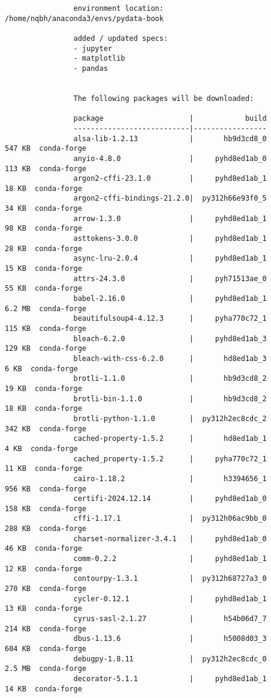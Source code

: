 \documentclass{article}
\begin{document}
\begin{itemize}
\begin{itemize}
\begin{itemize}
\begin{verbatim}
				environment location: /home/nqbh/anaconda3/envs/pydata-book
				
				added / updated specs:
				- jupyter
				- matplotlib
				- pandas
				
				
				The following packages will be downloaded:
				
				package                    |            build
				---------------------------|-----------------
				alsa-lib-1.2.13            |       hb9d3cd8_0         547 KB  conda-forge
				anyio-4.8.0                |     pyhd8ed1ab_0         113 KB  conda-forge
				argon2-cffi-23.1.0         |     pyhd8ed1ab_1          18 KB  conda-forge
				argon2-cffi-bindings-21.2.0|  py312h66e93f0_5          34 KB  conda-forge
				arrow-1.3.0                |     pyhd8ed1ab_1          98 KB  conda-forge
				asttokens-3.0.0            |     pyhd8ed1ab_1          28 KB  conda-forge
				async-lru-2.0.4            |     pyhd8ed1ab_1          15 KB  conda-forge
				attrs-24.3.0               |     pyh71513ae_0          55 KB  conda-forge
				babel-2.16.0               |     pyhd8ed1ab_1         6.2 MB  conda-forge
				beautifulsoup4-4.12.3      |     pyha770c72_1         115 KB  conda-forge
				bleach-6.2.0               |     pyhd8ed1ab_3         129 KB  conda-forge
				bleach-with-css-6.2.0      |       hd8ed1ab_3           6 KB  conda-forge
				brotli-1.1.0               |       hb9d3cd8_2          19 KB  conda-forge
				brotli-bin-1.1.0           |       hb9d3cd8_2          18 KB  conda-forge
				brotli-python-1.1.0        |  py312h2ec8cdc_2         342 KB  conda-forge
				cached-property-1.5.2      |       hd8ed1ab_1           4 KB  conda-forge
				cached_property-1.5.2      |     pyha770c72_1          11 KB  conda-forge
				cairo-1.18.2               |       h3394656_1         956 KB  conda-forge
				certifi-2024.12.14         |     pyhd8ed1ab_0         158 KB  conda-forge
				cffi-1.17.1                |  py312h06ac9bb_0         288 KB  conda-forge
				charset-normalizer-3.4.1   |     pyhd8ed1ab_0          46 KB  conda-forge
				comm-0.2.2                 |     pyhd8ed1ab_1          12 KB  conda-forge
				contourpy-1.3.1            |  py312h68727a3_0         270 KB  conda-forge
				cycler-0.12.1              |     pyhd8ed1ab_1          13 KB  conda-forge
				cyrus-sasl-2.1.27          |       h54b06d7_7         214 KB  conda-forge
				dbus-1.13.6                |       h5008d03_3         604 KB  conda-forge
				debugpy-1.8.11             |  py312h2ec8cdc_0         2.5 MB  conda-forge
				decorator-5.1.1            |     pyhd8ed1ab_1          14 KB  conda-forge

\end{verbatim}
\end{itemize}
\end{itemize}
\end{itemize}
\end{document}
